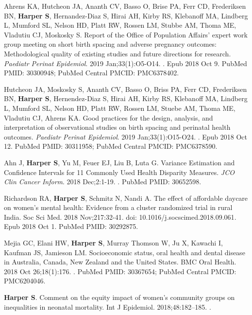 \documentclass[
  letterpaper,
  DIV=11,
  numbers=noendperiod]{scrartcl}
\begin{document}
\begin{etaremune}
\item Ahrens KA, Hutcheon JA, Ananth CV, Basso O, Brise PA, Ferr CD, Frederiksen BN, \textbf{Harper S}, Hernandez-Diaz S, Hirai AH, Kirby RS, Klebanoff MA, Lindberg L, Mumford SL, Nelson HD, Platt RW, Rossen LM, Stubbe AM, Thoma ME, Vladutiu CJ, Moskosky S. Report of the Office of Population Affairs' expert work group meeting on short birth spacing and adverse pregnancy outcomes: Methodological quality of existing studies and future directions for research. \emph{Paediatr Perinat Epidemiol}. 2019 Jan;33(1):O5-O14. . Epub 2018 Oct 9. PubMed PMID: 30300948; PubMed Central PMCID: PMC6378402.

\item Hutcheon JA, Moskosky S, Ananth CV, Basso O, Briss PA, Ferr CD, Frederiksen BN, \textbf{Harper S}, Hernendez-Diaz S, Hirai AH, Kirby RS, Klebanoff MA, Lindberg L, Mumford SL, Nelson HD, Platt RW, Rossen LM, Stuebe AM, Thoma ME, Vladutiu CJ, Ahrens KA. Good practices for the design, analysis, and interpretation of observational studies on birth spacing and perinatal health outcomes. \emph{Paediatr Perinat Epidemiol}. 2019 Jan;33(1):O15-O24. . Epub 2018 Oct 12. PubMed PMID: 30311958; PubMed Central PMCID: PMC6378590.

\item Ahn J, \textbf{Harper S}, Yu M, Feuer EJ, Liu B, Luta G. Variance Estimation and Confidence Intervals for 11 Commonly Used Health Disparity Measures. \emph{JCO Clin Cancer Inform}. 2018 Dec;2:1-19. . PubMed PMID: 30652598.

\item *Richardson RA, \textbf{Harper S}, Schmitz N, Nandi A. The effect of affordable daycare on women's mental health: Evidence from a cluster randomized trial in rural India. Soc Sci Med. 2018 Nov;217:32-41. doi{: 10.1016/j.socscimed.2018.09.061}. Epub 2018 Oct 1. PubMed PMID: 30292875.

\item Mejia GC, Elani HW, \textbf{Harper S}, Murray Thomson W, Ju X, Kawachi I, Kaufman JS, Jamieson LM. Socioeconomic status, oral health and dental disease in Australia, Canada, New Zealand and the United States. BMC Oral Health. 2018 Oct 26;18(1):176. . PubMed PMID: 30367654; PubMed Central PMCID: PMC6204046.

\item \textbf{Harper S}. Comment on the equity impact of women's community groups on inequalities in neonatal mortality. Int J Epidemiol. 2018;48:182–185. .


\end{etaremune}
\end{document}
